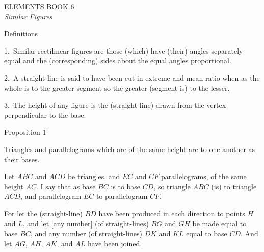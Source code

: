 \pagestyle{plain}
\begin{center}
{\Huge ELEMENTS BOOK 6}\\
\spa\spa\spa
{\huge\it Similar Figures}
\end{center}\newpage

\pagestyle{fancy}
\cfoot{\gr{\thepage}}

\begin{center}
{\large Definitions}
\end{center}

1.~Similar rectilinear figures  are those (which) have  (their) angles separately equal and the (corresponding) sides about the equal angles proportional.

2.~A straight-line is said to have been cut in extreme and mean ratio when
as the whole is to the greater segment so the greater (segment is) to the lesser.

3.~The height of any figure is the (straight-line)  drawn
from the vertex perpendicular to the base.


\begin{center}
{\large Proposition 1}$^\dag$
\end{center}

Triangles and parallelograms which are of the same height are to one another as their bases.

\epsfysize=2in
\centerline{}

Let $ABC$ and $ACD$ be triangles, and $EC$ and $CF$ parallelograms, of the same
height $AC$. I say that as  base $BC$ is to  base $CD$, so  triangle
$ABC$ (is) to  triangle $ACD$, and  parallelogram $EC$ to  parallelogram
$CF$.

For let the (straight-line) $BD$ have been produced in each direction to points $H$ and $L$, and
let [any number] (of straight-lines) $BG$ and $GH$ be made equal to  base $BC$,
and any number (of straight-lines) $DK$ and $KL$ equal to  base $CD$.
And let $AG$, $AH$, $AK$, and $AL$ have been joined.

